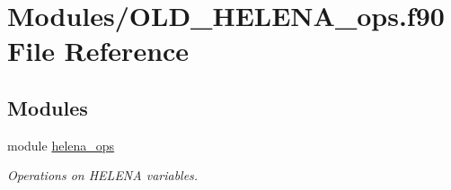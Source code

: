 \hypertarget{OLD__HELENA__ops_8f90}{}\section{Modules/\+O\+L\+D\+\_\+\+H\+E\+L\+E\+N\+A\+\_\+ops.f90 File Reference}
\label{OLD__HELENA__ops_8f90}
\subsection*{Modules}
\begin{DoxyCompactItemize}
\item 
module \hyperlink{namespacehelena__ops}{helena\+\_\+ops}
\begin{DoxyCompactList}\small\item\em Operations on H\+E\+L\+E\+NA variables. \end{DoxyCompactList}\end{DoxyCompactItemize}
